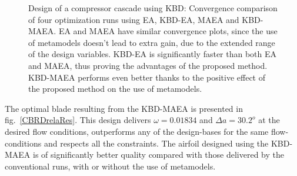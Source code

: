 \begin{figure}[h!]
\begin{minipage}[b]{1\linewidth}
 \centering
\end{minipage}
\caption{Design of a compressor cascade using KBD: Convergence comparison of four optimization runs using EA, KBD-EA, MAEA and KBD-MAEA. EA and MAEA have similar convergence plots, since the use of metamodels doesn't lead to extra gain, due to the extended range of the design variables. KBD-EA is significantly faster than  both EA and MAEA, thus proving the advantages of the proposed method. KBD-MAEA performs even better thanks to the positive effect of the proposed method on the use of metamodels.} 
\label{CBRDrela}
\end{figure}

The optimal blade resulting from the KBD-MAEA is presented in fig.\ \ref{CBRDrelaRes}. This design delivers $\omega\!=\!0.01834$ and $\Delta a\!=\!30.2^o$ at the desired flow conditions, outperforms any of the design-bases for the same flow-conditions and respects all the constraints. The airfoil designed using the KBD-MAEA is of significantly better quality compared with those delivered by the conventional runs, with or without the use of metamodels. 

